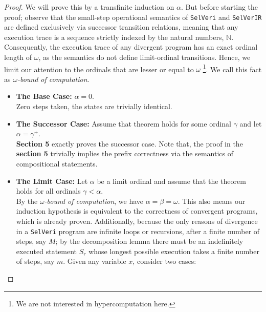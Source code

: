 \documentclass{article}
\begin{document}
\begin{proof} We will prove this by a transfinite induction on $\alpha$. But before starting the proof; observe that the small-step operational semantics of \texttt{SelVeri} and \texttt{SelVerIR} are defined exclusively via successor transition relations, meaning that any execution trace is a sequence strictly indexed by the natural numbers, $\mathbb{N}$. Consequently, the execution trace of any divergent program has an exact ordinal length of $\omega$, as the semantics do not define limit-ordinal transitions. Hence, we limit our attention to the ordinals that are lesser or equal to $\omega$ \footnote{We are not interested in hypercomputation here.}. We call this fact as \textit{$\omega$-bound of computation}.

    \begin{itemize}
        \item \textbf{The Base Case:} $\alpha = 0$. \\
        Zero steps taken, the states are trivially identical.

        \item \textbf{The Successor Case:} Assume that theorem holds for some ordinal $\gamma$ and let $\alpha = \gamma^+$. \\
        \textbf{Section 5} exactly proves the successor case. Note that, the proof in the \textbf{section 5} trivially implies the prefix correctness via the semantics of compositional statements.

        \item \textbf{The Limit Case:} Let $\alpha$ be a limit ordinal and assume that the theorem holds for all ordinals $\gamma < \alpha$. \\ By the \textit{$\omega$-bound of computation}, we have $\alpha = \beta = \omega$. This also means our induction hypothesis is equivalent to the correctness of convergent programs, which is already proven. Additionally, because the only reasons of divergence in a \texttt{SelVeri} program are infinite loops or recursions, after a finite number of steps, say $M$; by the decomposition lemma there must be an indefinitely executed statement $S_r$  whose longest possible execution takes a finite number of steps, say $m$. Given any variable $x$, consider two cases:


\end{itemize}
\end{proof}
\end{document}
